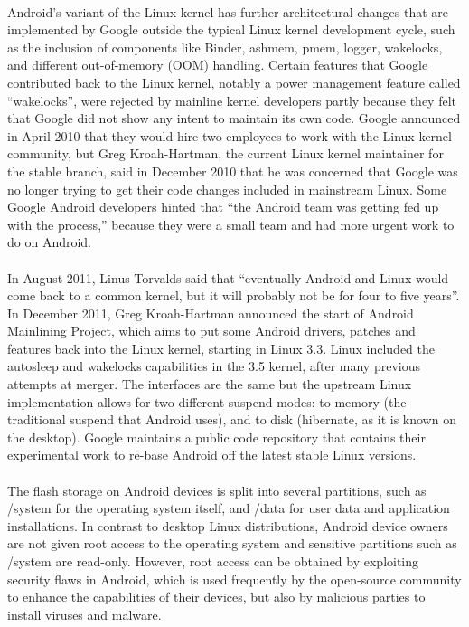 \documentclass[a4paper,12pt]{report}
\begin{document}
\paragraph{}Android's variant of the Linux kernel has further architectural changes that are implemented by Google outside the typical Linux kernel development cycle, such as the inclusion of components like Binder, ashmem, pmem, logger, wakelocks, and different out-of-memory (OOM) handling. Certain features that Google contributed back to the Linux kernel, notably a power management feature called ``wakelocks'', were rejected by mainline kernel developers partly because they felt that Google did not show any intent to maintain its own code. Google announced in April 2010 that they would hire two employees to work with the Linux kernel community, but Greg Kroah-Hartman, the current Linux kernel maintainer for the stable branch, said in December 2010 that he was concerned that Google was no longer trying to get their code changes included in mainstream Linux. Some Google Android developers hinted that ``the Android team was getting fed up with the process,'' because they were a small team and had more urgent work to do on Android.
\paragraph{}In August 2011, Linus Torvalds said that ``eventually Android and Linux would come back to a common kernel, but it will probably not be for four to five years''. In December 2011, Greg Kroah-Hartman announced the start of Android Mainlining Project, which aims to put some Android drivers, patches and features back into the Linux kernel, starting in Linux 3.3. Linux included the autosleep and wakelocks capabilities in the 3.5 kernel, after many previous attempts at merger. The interfaces are the same but the upstream Linux implementation allows for two different suspend modes: to memory (the traditional suspend that Android uses), and to disk (hibernate, as it is known on the desktop). Google maintains a public code repository that contains their experimental work to re-base Android off the latest stable Linux versions.
\paragraph{}The flash storage on Android devices is split into several partitions, such as /system for the operating system itself, and /data for user data and application installations. In contrast to desktop Linux distributions, Android device owners are not given root access to the operating system and sensitive partitions such as /system are read-only. However, root access can be obtained by exploiting security flaws in Android, which is used frequently by the open-source community to enhance the capabilities of their devices, but also by malicious parties to install viruses and malware.
\end{document}
